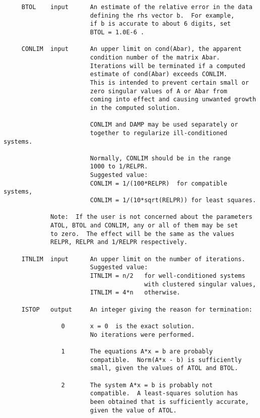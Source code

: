 \begin{verbatim}
     BTOL    input      An estimate of the relative error in the data
                        defining the rhs vector b.  For example,
                        if b is accurate to about 6 digits, set
                        BTOL = 1.0E-6 .

     CONLIM  input      An upper limit on cond(Abar), the apparent
                        condition number of the matrix Abar.
                        Iterations will be terminated if a computed
                        estimate of cond(Abar) exceeds CONLIM.
                        This is intended to prevent certain small or
                        zero singular values of A or Abar from
                        coming into effect and causing unwanted growth
                        in the computed solution.

                        CONLIM and DAMP may be used separately or
                        together to regularize ill-conditioned systems.

                        Normally, CONLIM should be in the range
                        1000 to 1/RELPR.
                        Suggested value:
                        CONLIM = 1/(100*RELPR)  for compatible systems,
                        CONLIM = 1/(10*sqrt(RELPR)) for least squares.

             Note:  If the user is not concerned about the parameters
             ATOL, BTOL and CONLIM, any or all of them may be set
             to zero.  The effect will be the same as the values
             RELPR, RELPR and 1/RELPR respectively.

     ITNLIM  input      An upper limit on the number of iterations.
                        Suggested value:
                        ITNLIM = n/2   for well-conditioned systems
                                       with clustered singular values,
                        ITNLIM = 4*n   otherwise.

     ISTOP   output     An integer giving the reason for termination:

                0       x = 0  is the exact solution.
                        No iterations were performed.

                1       The equations A*x = b are probably
                        compatible.  Norm(A*x - b) is sufficiently
                        small, given the values of ATOL and BTOL.

                2       The system A*x = b is probably not
                        compatible.  A least-squares solution has
                        been obtained that is sufficiently accurate,
                        given the value of ATOL.


\end{verbatim}
